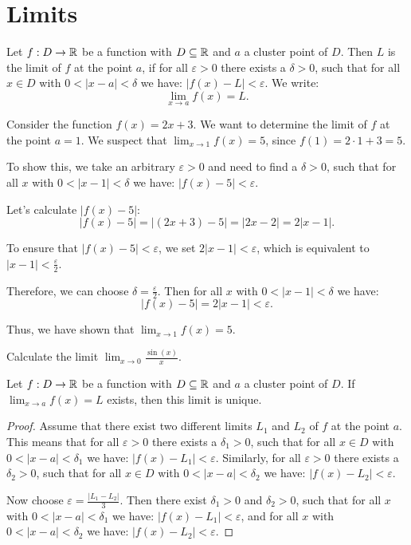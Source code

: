 \chapter{Limits}

\begin{definition}[Limit]
  Let $f: D \to \mathbb{R}$ be a function with $D \subseteq \mathbb{R}$ and $a$ a cluster point of $D$. Then $L$ is the limit of $f$ at the point $a$, if for all $\varepsilon > 0$ there exists a $\delta > 0$, such that for all $x \in D$ with $0 < |x - a| < \delta$ we have: $|f(x) - L| < \varepsilon$. We write:
  \[
    \lim_{x \to a} f(x) = L.
  \]
\end{definition}

\begin{example}
  Consider the function $f(x) = 2x + 3$. We want to determine the limit of $f$ at the point $a = 1$. We suspect that $\lim_{x \to 1} f(x) = 5$, since $f(1) = 2 \cdot 1 + 3 = 5$.

  To show this, we take an arbitrary $\varepsilon > 0$ and need to find a $\delta > 0$, such that for all $x$ with $0 < |x - 1| < \delta$ we have: $|f(x) - 5| < \varepsilon$.

  Let's calculate $|f(x) - 5|$:
  \[
    |f(x) - 5| = |(2x + 3) - 5| = |2x - 2| = 2|x - 1|.
  \]

  To ensure that $|f(x) - 5| < \varepsilon$, we set $2|x - 1| < \varepsilon$, which is equivalent to $|x - 1| < \frac{\varepsilon}{2}$.

  Therefore, we can choose $\delta = \frac{\varepsilon}{2}$. Then for all $x$ with $0 < |x - 1| < \delta$ we have:
  \[
    |f(x) - 5| = 2|x - 1| < \varepsilon.
  \]

  Thus, we have shown that $\lim_{x \to 1} f(x) = 5$.
\end{example}

\begin{exercise}
  Calculate the limit $\lim_{x \to 0} \frac{\sin(x)}{x}$.
\end{exercise}

\begin{proposition}
  Let $f: D \to \mathbb{R}$ be a function with $D \subseteq \mathbb{R}$ and $a$ a cluster point of $D$. If $\lim_{x \to a} f(x) = L$ exists, then this limit is unique.
\end{proposition}

\begin{proof}
  Assume that there exist two different limits $L_1$ and $L_2$ of $f$ at the point $a$. This means that for all $\varepsilon > 0$ there exists a $\delta_1 > 0$, such that for all $x \in D$ with $0 < |x - a| < \delta_1$ we have: $|f(x) - L_1| < \varepsilon$. Similarly, for all $\varepsilon > 0$ there exists a $\delta_2 > 0$, such that for all $x \in D$ with $0 < |x - a| < \delta_2$ we have: $|f(x) - L_2| < \varepsilon$.

  Now choose $\varepsilon = \frac{|L_1 - L_2|}{3}$. Then there exist $\delta_1 > 0$ and $\delta_2 > 0$, such that for all $x$ with $0 < |x - a| < \delta_1$ we have: $|f(x) - L_1| < \varepsilon$, and for all $x$ with $0 < |x - a| < \delta_2$ we have: $|f(x) - L_2| < \varepsilon$.
\end{proof}

